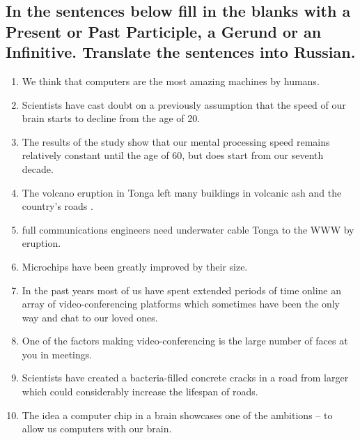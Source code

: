 \subsection*{In the sentences below fill in the blanks with a Present or Past Participle, a Gerund or
      an Infinitive. Translate the sentences into Russian.}
\begin{enumerate}
      \item We think that computers are the most amazing machines \underline{\hspace{2cm}} by humans.
      \item Scientists have cast doubt on a previously \underline{\hspace{2cm}} assumption that the \underline{\hspace{2cm}} speed of our brain starts to decline from the age of 20.
      \item The results of the study show that our mental processing speed remains relatively constant until the age of 60, but does start \underline{\hspace{2cm}} from our seventh decade.
      \item The volcano eruption in Tonga left many buildings \underline{\hspace{2cm}} in volcanic ash and the country’s roads \underline{\hspace{2cm}}.
      \item \underline{\hspace{2cm}} full communications engineers need \underline{\hspace{2cm}} underwater cable \underline{\hspace{2cm}} Tonga to the WWW \underline{\hspace{2cm}} by eruption.
      \item Microchips have been greatly improved by \underline{\hspace{2cm}} their size.
      \item In the past years most of us have spent extended periods of time online \underline{\hspace{2cm}} an array of video-conferencing platforms which sometimes have been the only way \underline{\hspace{2cm}} and chat to our loved ones.
      \item One of the factors making video-conferencing \underline{\hspace{2cm}} is the large number of faces \underline{\hspace{2cm}} at you in meetings.
      \item Scientists have created a bacteria-filled concrete \underline{\hspace{2cm}} cracks in a road from \underline{\hspace{2cm}} larger which could considerably increase the lifespan of roads.
      \item The idea \underline{\hspace{2cm}} a computer chip in a brain showcases one of the ambitions – to allow us \underline{\hspace{2cm}} computers with our brain.
\end{enumerate}

